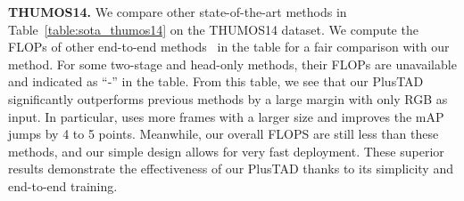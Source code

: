 \documentclass[a4paper,fleqn]{cas-dc}
\begin{document}
\textbf{THUMOS14.}
We compare other state-of-the-art methods in Table~\ref{table:sota_thumos14} on the THUMOS14 dataset. 
We compute the FLOPs of other end-to-end methods~\citep{afsd,rgb_enough,e2e-TADTR,r-c3d} in the table for a fair comparison with our method. 
For some two-stage and head-only methods, their FLOPs are unavailable and indicated as ``-'' in the table.
From this table, we see that our PlusTAD significantly outperforms previous methods by a large margin with only RGB as input. 
In particular,  uses more frames with a larger size and improves the mAP jumps by 4 to 5 points.
Meanwhile, our overall FLOPS are still less than these methods, and our simple design allows for very fast deployment.
These superior results demonstrate the effectiveness of our PlusTAD thanks to its simplicity and end-to-end training. 


\begin{table*}[t]
\centering
\small
\caption{\textbf{Comparison with state of the art on the FineAction dataset.} ``RGB-Only" means whether to use other input modalities besides RGB input.}
\setlength\tabcolsep{4.45mm}
\label{table:fineaction}
\end{table*}
\end{document}
